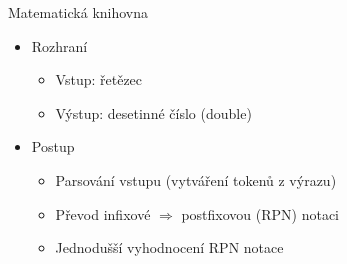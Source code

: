 \documentclass[fleqn]{beamer}
\begin{document}
\begin{frame}{Matematická knihovna}
\begin{itemize}
    \item Rozhraní
    \pause
    \begin{itemize}
        \item Vstup: řetězec
        \item Výstup: desetinné číslo (double)
        \pause
    \end{itemize}
    \item Postup
    \pause
    \begin{itemize}
        \item Parsování vstupu (vytváření tokenů z výrazu)
        \pause
        \item Převod infixové $\Rightarrow$ postfixovou (RPN) notaci
        \pause
        \item Jednodušší vyhodnocení RPN notace
    \end{itemize}
\end{itemize}

\end{frame}
\end{document}
